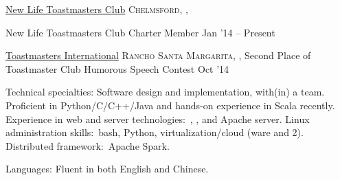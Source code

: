 \documentclass[10pt,a4paper]{article} %
\begin{document}
\headedsection %
{\href{http://nltmc.toastmastersclubs.org/}{New Life Toastmasters Club}}
{\textsc{Chelmsford, , }}  {

\headedsubsection %
{New Life Toastmasters Club Charter Member}
{Jan '14 -- Present}
{}
}

\headedsection %
{\href{http://www.toastmasters.org/}{Toastmasters International}}
{\textsc{Rancho Santa Margarita, , }}  {
\headedsubsection %
{Second Place of Toastmaster Club Humorous Speech Contest}
{Oct '14}
{}
}




\spacedhrule{0.5em}{-0.4em} %



\inlineheadsection %
{Technical specialties:}
{Software design and implementation, with(in) a team. Proficient in Python/C/C++/Java and hands-on experience in Scala recently. Experience in web and server technologies:\ , ,  and Apache server. Linux administration skills:\ bash, Python, virtualization/cloud (ware and 2). Distributed framework:\ Apache Spark.}


\inlineheadsection %
{Languages:}
{Fluent in both English and Chinese.}




%

\end{document}
